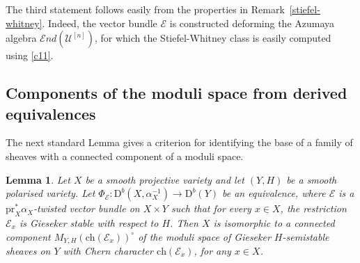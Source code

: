 \documentclass[12pt,a4paper]{amsart}
\theoremstyle{plain}
\newtheorem{lem}[thm]{Lemma}
\theoremstyle{definition}
\theoremstyle{remark}
\def\ch{\mathrm{ch}}
\def\pr{\mathrm{pr}}
\newcommand{\D}{\mathrm{D}^b}
\newcommand{\kE}{\mathcal{E}}
\begin{document}
The third statement follows easily from the properties in Remark~\ref{stiefel-whitney}.
Indeed, the vector bundle $\mathcal{E}$ is constructed deforming the Azumaya algebra $\mathcal{E}nd(\mathcal{U}^{[n]})$, for which the Stiefel-Whitney class is easily computed using \eqref{c11}.


\subsection{Components of the moduli space from derived equivalences} 
The next standard Lemma gives a criterion for identifying the base of a family of sheaves with a connected component of a moduli space.

\begin{lem}\label{lem_Ymodulisp}
    Let $X$ be a smooth projective variety and let $(Y,H)$ be a smooth polarised variety. Let $\Phi_{\kE}\colon \D(X,\alpha_{X}^{-1})\to \D(Y)$ be an equivalence, where $\kE$ is a $\pr_X^*\alpha_{X}$-twisted vector bundle on $X\times Y$ such that for every $x\in X$, the restriction $\kE_{x}$ is Gieseker stable with respect to $H$.
    Then $X$ is isomorphic to a connected component $M_{Y,H}(\ch(\kE_{x}))^{\circ}$ of the moduli space of Gieseker $H$-semistable sheaves on $Y$ with Chern character $\ch(\kE_{x})$, for any $x\in X$.
\end{lem}
\end{document}
